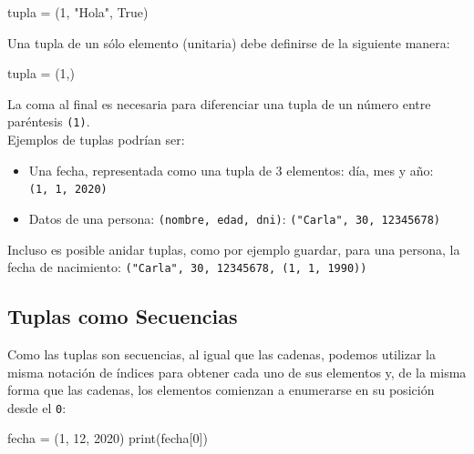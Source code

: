 \documentclass[
  letterpaper,
  DIV=11,
  numbers=noendperiod]{scrreprt}
\newenvironment{Shaded}{\begin{snugshade}}{\end{snugshade}}
\newcommand{\BuiltInTok}[1]{\textcolor[rgb]{0.00,0.23,0.31}{#1}}
\newcommand{\DecValTok}[1]{\textcolor[rgb]{0.68,0.00,0.00}{#1}}
\newcommand{\NormalTok}[1]{\textcolor[rgb]{0.00,0.23,0.31}{#1}}
\newcommand{\OperatorTok}[1]{\textcolor[rgb]{0.37,0.37,0.37}{#1}}
\newcommand{\StringTok}[1]{\textcolor[rgb]{0.13,0.47,0.30}{#1}}
\newcommand{\VariableTok}[1]{\textcolor[rgb]{0.07,0.07,0.07}{#1}}
\providecommand{\tightlist}{%
  \setlength{\itemsep}{0pt}\setlength{\parskip}{0pt}}\usepackage{longtable,booktabs,array}
\begin{document}
\begin{Shaded}
\begin{Highlighting}[]
\NormalTok{tupla }\OperatorTok{=}\NormalTok{ (}\DecValTok{1}\NormalTok{, }\StringTok{"Hola"}\NormalTok{, }\VariableTok{True}\NormalTok{)}
\end{Highlighting}
\end{Shaded}

Una tupla de un sólo elemento (unitaria) debe definirse de la siguiente
manera:

\begin{Shaded}
\begin{Highlighting}[]
\NormalTok{tupla }\OperatorTok{=}\NormalTok{ (}\DecValTok{1}\NormalTok{,)}
\end{Highlighting}
\end{Shaded}

La coma al final es necesaria para diferenciar una tupla de un número
entre paréntesis \texttt{(1)}.\\

Ejemplos de tuplas podrían ser:

\begin{itemize}
\tightlist
\item
  Una fecha, representada como una tupla de 3 elementos: día, mes y año:
  \texttt{(1,\ 1,\ 2020)}
\item
  Datos de una persona: \texttt{(nombre,\ edad,\ dni)}:
  \texttt{("Carla",\ 30,\ 12345678)}
\end{itemize}

Incluso es posible anidar tuplas, como por ejemplo guardar, para una
persona, la fecha de nacimiento:
\texttt{("Carla",\ 30,\ 12345678,\ (1,\ 1,\ 1990))}

\subsection{Tuplas como Secuencias}\label{tuplas-como-secuencias}

Como las tuplas son secuencias, al igual que las cadenas, podemos
utilizar la misma notación de índices para obtener cada uno de sus
elementos y, de la misma forma que las cadenas, los elementos comienzan
a enumerarse en su posición desde el \texttt{0}:

\begin{Shaded}
\begin{Highlighting}[]
\NormalTok{fecha }\OperatorTok{=}\NormalTok{ (}\DecValTok{1}\NormalTok{, }\DecValTok{12}\NormalTok{, }\DecValTok{2020}\NormalTok{)}
\BuiltInTok{print}\NormalTok{(fecha[}\DecValTok{0}\NormalTok{])}
\end{Highlighting}
\end{Shaded}
\end{document}
